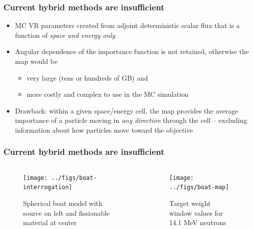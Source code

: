 \documentclass[xcolor=x11names,compress]{beamer}
\renewcommand{\(}{\begin{columns}}
\renewcommand{\)}{\end{columns}}
\newcommand{\<}[1]{\begin{column}{#1}}
\renewcommand{\>}{\end{column}}
\begin{document}
\begin{frame}[fragile]
  \frametitle{Current hybrid methods are insufficient}

	\begin{itemize}
	\item MC VR parameters created from adjoint deterministic scalar flux that is a function of \textit{space and energy only} \vspace*{1 em}
	\item Angular dependence of the importance function is not retained, otherwise the map would be 
	\begin{itemize}
	  \item very large (tens or hundreds of GB) and
	  \item  more costly and complex to use in the MC simulation 
	\end{itemize}
	\item Drawback: within a given space/energy cell, the map provides the average importance of a particle moving in \textit{any direction} through the cell -- excluding information about how particles move \alert{toward the objective}
	\end{itemize}

\end{frame}


\begin{frame}[fragile]
  \frametitle{Current hybrid methods are insufficient}

	\begin{columns}
  	\begin{column}{0.5\textwidth}
 	 \begin{center}
 	 \begin{figure}
 	 \texttt{[image: ../figs/boat-interrogation]}  
 	 \caption{Spherical boat model with source on left and fissionable material at center}
 	 \end{figure}
 	 \end{center}
  	\end{column}
 	\begin{column}{0.5\textwidth}
 	 \begin{center}
 	 \begin{figure}
 	 \texttt{[image: ../figs/boat-map]}  
 	 \caption{Target weight window values for 14.1 MeV neutrons}
 	 \end{figure}
 	 \end{center}
  	\end{column}
	\end{columns}

\end{frame}
\end{document}
